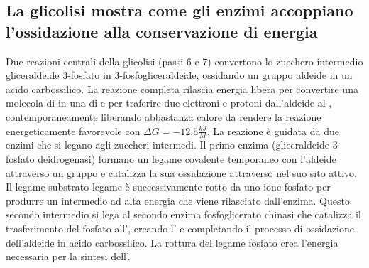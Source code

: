 \subsection{La glicolisi mostra come gli enzimi accoppiano l'ossidazione alla conservazione di energia}
Due reazioni centrali della glicolisi (passi 6 e 7) convertono lo zucchero intermedio gliceraldeide 3-fosfato in 3-fosfogliceraldeide, ossidando un gruppo aldeide in un acido 
carbossilico. La reazione completa rilascia energia libera per convertire una molecola di  in una di  e per traferire due elettroni e protoni dall'aldeide al , 
contemporaneamente liberando abbastanza calore da rendere la reazione energeticamente favorevole con $\Delta G = -12.5\frac{kJ}{M}$. La reazione \`e guidata da due enzimi che si legano
agli zuccheri intermedi. Il primo enzima (gliceraldeide 3-fosfato deidrogenasi) formano un legame covalente temporaneo con l'aldeide attraverso un gruppo  e catalizza la sua
ossidazione attraverso  nel suo sito attivo. Il legame substrato-legame \`e successivamente rotto da uno ione fosfato per produrre un intermedio ad alta energia che viene 
rilasciato dall'enzima. Questo secondo intermedio si lega al secondo enzima fosfoglicerato chinasi che catalizza il trasferimento del fosfato all', creando l' e 
completando il processo di ossidazione dell'aldeide in acido carbossilico. La rottura del legame fosfato crea l'energia necessaria per la sintesi dell'. 
